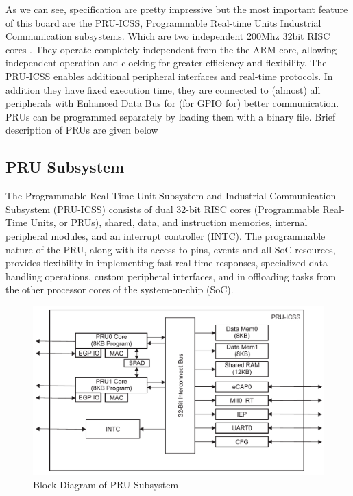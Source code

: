 As we can see, specification are pretty impressive but the most important feature of this board are the PRU-ICSS, Programmable Real-time Units Industrial Communication subsystems. Which are two independent 200Mhz 32bit RISC cores . They operate completely independent from the the ARM core,  allowing independent operation and clocking for greater efficiency and flexibility. The PRU-ICSS enables additional peripheral interfaces and real-time protocols. In addition they have fixed execution time, they are connected to (almost) all peripherals with Enhanced Data Bus for (for GPIO for) better communication. PRUs can be programmed separately by loading them with a binary file. Brief description of PRUs are given below

\subsection{PRU Subsystem}
The Programmable Real-Time Unit Subsystem and Industrial Communication Subsystem (PRU-ICSS) consists of dual 32-bit RISC cores (Programmable Real-Time Units, or PRUs), shared, data, and instruction memories, internal peripheral modules, and an interrupt controller (INTC). The programmable nature of the PRU, along with its access to pins, events and all SoC resources, provides flexibility in implementing fast real-time responses, specialized data handling operations, custom peripheral interfaces, and in offloading tasks from the other processor cores of the system-on-chip (SoC).

\begin{figure}
	\includegraphics[width=\textwidth]{fig/PRUIcss.png}
	\caption{Block Diagram of PRU Subsystem}
	\label{fig:prublkdrg}
\end{figure}

